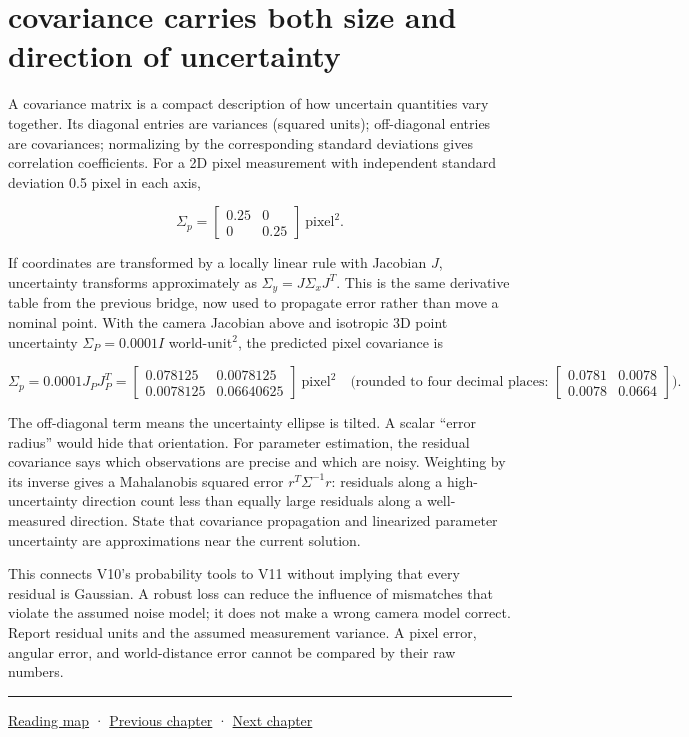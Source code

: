 \section{covariance carries both size and direction of uncertainty}\label{02-foundations-ii-ch034-covariance-carries-both-size-and-direction-of-uncertainty}

A covariance matrix is a compact description of how uncertain quantities vary together. Its diagonal entries are variances (squared units); off-diagonal entries are covariances; normalizing by the corresponding standard deviations gives correlation coefficients. For a 2D pixel measurement with independent standard deviation 0.5 pixel in each axis,

\[\Sigma_p=\begin{bmatrix}0.25&0\\0&0.25\end{bmatrix}\ \text{pixel}^2.\]

If coordinates are transformed by a locally linear rule with Jacobian \(J\), uncertainty transforms approximately as \(\Sigma_y=J\Sigma_xJ^T\). This is the same derivative table from the previous bridge, now used to propagate error rather than move a nominal point. With the camera Jacobian above and isotropic 3D point uncertainty \(\Sigma_P=0.0001I\) world-unit\(^2\), the predicted pixel covariance is

\[\Sigma_p=0.0001J_PJ_P^T=\begin{bmatrix}0.078125&0.0078125\\0.0078125&0.06640625\end{bmatrix}\ \text{pixel}^2\quad\text{(rounded to four decimal places: }\begin{bmatrix}0.0781&0.0078\\0.0078&0.0664\end{bmatrix}).\]

The off-diagonal term means the uncertainty ellipse is tilted. A scalar ``error radius'' would hide that orientation. For parameter estimation, the residual covariance says which observations are precise and which are noisy. Weighting by its inverse gives a Mahalanobis squared error \(r^T\Sigma^{-1}r\): residuals along a high-uncertainty direction count less than equally large residuals along a well-measured direction. State that covariance propagation and linearized parameter uncertainty are approximations near the current solution.

This connects V10's probability tools to V11 without implying that every residual is Gaussian. A robust loss can reduce the influence of mismatches that violate the assumed noise model; it does not make a wrong camera model correct. Report residual units and the assumed measurement variance. A pixel error, angular error, and world-distance error cannot be compared by their raw numbers.

\begin{center}\rule{0.5\linewidth}{0.5pt}\end{center}

\hyperref[volume-reading-map]{Reading map} · \hyperref[02-foundations-ii-ch033-projection-clipping-and-raster-sampling]{Previous chapter} · \hyperref[02-foundations-ii-ch035-camera-extrinsics-and-projection-geometry]{Next chapter}
